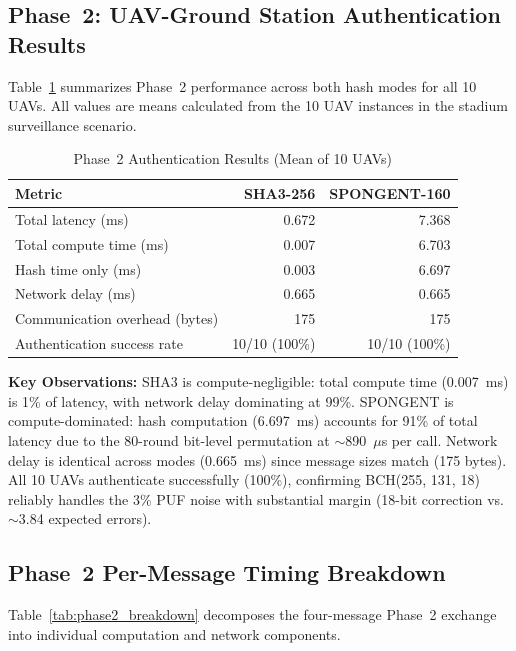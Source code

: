 \documentclass[11pt,a4paper]{article}
\begin{document}
\subsection{Phase~2: UAV-Ground Station Authentication Results}

Table~\ref{tab:phase2_results} summarizes Phase~2 performance across both hash modes for all 10 UAVs. All values are means calculated from the 10 UAV instances in the stadium surveillance scenario.

\begin{table}[H]
\centering
\caption{Phase~2 Authentication Results (Mean of 10 UAVs)}
\label{tab:phase2_results}
\begin{tabular}{@{}lrr@{}}
\toprule
\textbf{Metric} & \textbf{SHA3-256} & \textbf{SPONGENT-160} \\
\midrule
Total latency (ms) & 0.672 & 7.368 \\
Total compute time (ms) & 0.007 & 6.703 \\
Hash time only (ms) & 0.003 & 6.697 \\
Network delay (ms) & 0.665 & 0.665 \\
Communication overhead (bytes) & 175 & 175 \\
Authentication success rate & 10/10 (100\%) & 10/10 (100\%) \\
\bottomrule
\end{tabular}
\end{table}

\textbf{Key Observations:} SHA3 is compute-negligible: total compute time (0.007~ms) is 1\% of latency, with network delay dominating at 99\%. SPONGENT is compute-dominated: hash computation (6.697~ms) accounts for 91\% of total latency due to the 80-round bit-level permutation at $\sim$890~$\mu$s per call. Network delay is identical across modes (0.665~ms) since message sizes match (175 bytes). All 10 UAVs authenticate successfully (100\%), confirming BCH(255, 131, 18) reliably handles the 3\% PUF noise with substantial margin (18-bit correction vs.\ $\sim$3.84 expected errors).

\subsection{Phase~2 Per-Message Timing Breakdown}

Table~\ref{tab:phase2_breakdown} decomposes the four-message Phase~2 exchange into individual computation and network components.
\end{document}
